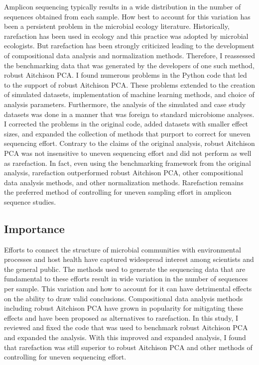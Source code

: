 \documentclass[
  11pt,
]{article}
\begin{document}
Amplicon sequencing typically results in a wide distribution in the
number of sequences obtained from each sample. How best to account for
this variation has been a persistent problem in the microbial ecology
literature. Historically, rarefaction has been used in ecology and this
practice was adopted by microbial ecologists. But rarefaction has been
strongly criticized leading to the development of compositional data
analysis and normalization methods. Therefore, I reassessed the
benchmarking data that was generated by the developers of one such
method, robust Aitchison PCA. I found numerous problems in the Python
code that led to the support of robust Aitchison PCA. These problems
extended to the creation of simulated datasets, implementation of
machine learning methods, and choice of analysis parameters.
Furthermore, the analysis of the simulated and case study datasets was
done in a manner that was foreign to standard microbiome analyses. I
corrected the problems in the original code, added datasets with smaller
effect sizes, and expanded the collection of methods that purport to
correct for uneven sequencing effort. Contrary to the claims of the
original analysis, robust Aitchison PCA was not insensitive to uneven
sequencing effort and did not perform as well as rarefaction. In fact,
even using the benchmarking framework from the original analysis,
rarefaction outperformed robust Aitchison PCA, other compositional data
analysis methods, and other normalization methods. Rarefaction remains
the preferred method of controlling for uneven sampling effort in
amplicon sequence studies.

\subsection{Importance}\label{importance}

Efforts to connect the structure of microbial communities with
environmental processes and host health have captured widespread
interest among scientists and the general public. The methods used to
generate the sequencing data that are fundamental to these efforts
result in wide variation in the number of sequences per sample. This
variation and how to account for it can have detrimental effects on the
ability to draw valid conclusions. Compositional data analysis methods
including robust Aitchison PCA have grown in popularity for mitigating
these effects and have been proposed as alternatives to rarefaction. In
this study, I reviewed and fixed the code that was used to benchmark
robust Aitchison PCA and expanded the analysis. With this improved and
expanded analysis, I found that rarefaction was still superior to robust
Aitchison PCA and other methods of controlling for uneven sequencing
effort.
\end{document}
